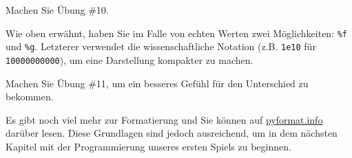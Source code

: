 \documentclass[
]{book}
\begin{document}
Machen Sie Übung \#10.

Wie oben erwähnt, haben Sie im Falle von echten Werten zwei Möglichkeiten: \texttt{\%f} und \texttt{\%g}. Letzterer verwendet die wissenschaftliche Notation (z.B. \texttt{1e10} für \texttt{10000000000}), um eine Darstellung kompakter zu machen.

Machen Sie Übung \#11, um ein besseres Gefühl für den Unterschied zu bekommen.

Es gibt noch viel mehr zur Formatierung und Sie können auf \href{https://pyformat.info/}{pyformat.info} darüber lesen. Diese Grundlagen sind jedoch ausreichend, um in dem nächsten Kapitel mit der Programmierung unseres ersten Spiels zu beginnen.

  
\end{document}
